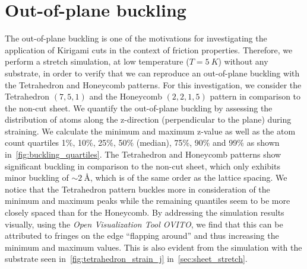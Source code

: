 \section{Out-of-plane buckling}\label{sec:out-of-plane_buckling}
The out-of-plane buckling is one of the motivations for investigating
the application of Kirigami cuts in the context of friction properties. Therefore, we perform a stretch simulation, at low temperature ($T = \SI{5}{K}$) without any substrate, in order to verify that we can reproduce an out-of-plane buckling with the Tetrahedron and Honeycomb patterns. For this investigation, we consider the Tetrahedron $(7,5,1)$ and the Honeycomb $(2,2,1,5)$ pattern in comparison to the non-cut sheet. We quantify the out-of-plane buckling by assessing the distribution of atoms along the z-direction (perpendicular to the plane) during straining. We calculate the
minimum and maximum z-value as well as the atom count quartiles 1\%, 10\%, 25\%, 50\% (median), 75\%, 90\% and 99\% as shown in~\cref{fig:buckling_quartiles}. The Tetrahedron and Honeycomb patterns show significant buckling in comparison to the non-cut sheet, which only exhibits minor buckling of $\sim \SI{2}{\text{Å}}$, which is of the same order as the lattice spacing. We notice that the Tetrahedron pattern buckles more in consideration of the minimum and maximum peaks while the remaining quantiles seem to be more closely spaced than for the Honeycomb. By addressing the simulation results visually, using the \textit{Open Visualization Tool OVITO}, we find that this can be attributed to fringes on the edge ``flapping around'' and thus increasing the minimum and maximum values. This is also evident from the simulation with the substrate seen in~\cref{fig:tetrahedron_strain_j} in~\cref{sec:sheet_stretch}.


